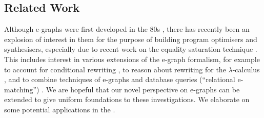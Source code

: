 %

\subsection{Related Work}

Although e-graphs were first developed in the 80s \cite{nelson1980techniques}, there has recently been an explosion of interest in them for the purpose of building program optimisers and synthesisers, especially due to recent work on the equality saturation technique \cite{10.1145/1594834.1480915, griggio_proceedings_2022, EggPaper,flatt_small_2022}.  This includes interest in various extensions of the e-graph formalism, for example to account for conditional rewriting \cite{singher2023colored},  to reason about rewriting for the $\lambda$-calculus \cite{koehler2022sketchguided},  and to combine techniques of e-graphs and database queries (``relational e-matching'') \cite{zhang_relational_2022}. 
We are hopeful that our novel perspective on e-graphs can be extended to give uniform foundations to these investigations.  
We elaborate on some potential applications in the .


